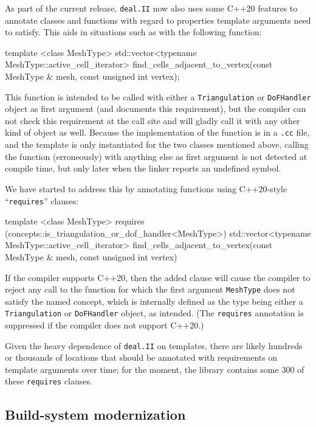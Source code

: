 \documentclass{ansarticle-preprint}
\newcommand{\specialword}[1]{\texttt{#1}}
\newcommand{\dealii}{{\specialword{deal.II}}\xspace}
\begin{document}
As part of the current release, \dealii{} now also uses some C++20
features to annotate classes and functions with regard to properties
template arguments need to satisfy. This aids in situations such as
with the
following function:
\begin{c++}
  template <class MeshType>
  std::vector<typename MeshType::active_cell_iterator>
  find_cells_adjacent_to_vertex(const MeshType &   mesh,
                                const unsigned int vertex);
\end{c++}
This function is intended to be called with either a
\texttt{Triangulation} or \texttt{DoFHandler} object as first
argument (and documents this requirement), but the compiler can not check this requirement at the call
site and will gladly call it with any other kind of object as
well. Because the implementation of the function is in a \texttt{.cc}
file, and the template is only instantiated for the two classes
mentioned above, calling the function (erroneously) with anything else
as first argument is not detected at compile time, but only later when
the linker reports an undefined symbol.

We have started to address this by annotating functions using
C++20-style ``\texttt{requires}'' clauses:
\begin{c++}
  template <class MeshType>
    requires (concepts::is_triangulation_or_dof_handler<MeshType>)
  std::vector<typename MeshType::active_cell_iterator>
  find_cells_adjacent_to_vertex(const MeshType &   mesh,
                                const unsigned int vertex)
\end{c++}
If the compiler supports C++20, then the added clause will cause the
compiler to reject any call to the function for which the first
argument \texttt{MeshType} does not satisfy the named concept, which
is internally defined as the type being either a \texttt{Triangulation} or \texttt{DoFHandler}
object, as intended. (The \texttt{requires} annotation is suppressed if the compiler
does not support C++20.)

Given the heavy dependence of \dealii{} on templates, there are likely
hundreds or thousands of locations that should be annotated with
requirements on template arguments over time; for the moment, the
library contains some 300 of these \texttt{requires} clauses.


\subsection{Build-system modernization}\label{sec:buildsystem}
\end{document}
